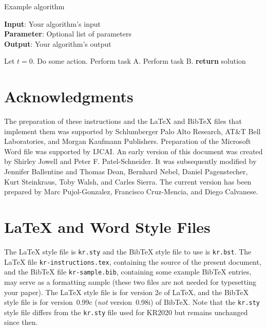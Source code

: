\documentclass{article}
\begin{document}
\begin{algorithm}[tb]
\caption{Example algorithm}
\label{alg:algorithm}
\textbf{Input}: Your algorithm's input\\
\textbf{Parameter}: Optional list of parameters\\
\textbf{Output}: Your algorithm's output
\begin{algorithmic}[1] %
\STATE Let $t=0$.
\STATE Do some action.
\STATE Perform task A.
\ELSE
\STATE Perform task B.
\ENDIF
\ENDWHILE
\STATE \textbf{return} solution
\end{algorithmic}
\end{algorithm}

\section*{Acknowledgments}

The preparation of these instructions and the \LaTeX{} and Bib\TeX{}
files that implement them was supported by Schlumberger Palo Alto
Research, AT\&T Bell Laboratories, and Morgan Kaufmann Publishers.
Preparation of the Microsoft Word file was supported by IJCAI.  An
early version of this document was created by Shirley Jowell and Peter
F. Patel-Schneider.  It was subsequently modified by Jennifer
Ballentine and Thomas Dean, Bernhard Nebel, Daniel Pagenstecher,
Kurt Steinkraus, Toby Walsh, and Carles Sierra. The current version
has been prepared by Marc Pujol-Gonzalez, Francisco Cruz-Mencia, and Diego
Calvanese.

\appendix

\section{\LaTeX{} and Word Style Files}
\label{stylefiles}


The \LaTeX{} style file is \texttt{kr.sty} and the Bib\TeX{} style file to use
is \texttt{kr.bst}.  The \LaTeX{} file \texttt{kr-instructions.tex}, containing
the source of the present document, and the Bib\TeX{} file
\texttt{kr-sample.bib}, containing some example Bib\TeX{} entries, may serve as
a formatting sample (these two files are not needed for typesetting your
paper).  The \LaTeX{} style file is for version 2e of \LaTeX{}, and the
Bib\TeX{} style file is for version~0.99c (\emph{not} version~0.98i) of
Bib\TeX{}.  Note that the \texttt{kr.sty} style file differs from the
\texttt{kr.sty} file used for KR2020 but remains unchanged since then.
\end{document}
